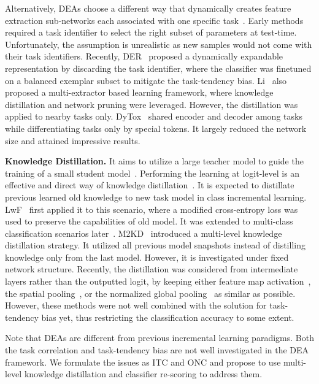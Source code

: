\documentclass[letterpaper]{article} %
\begin{document}
Alternatively, DEAs choose a different way that dynamically creates feature extraction sub-networks each associated with one specific task~\cite{t23, t27, t33, t56, t11, t67}. Early methods required a task identifier to select the right subset of parameters at test-time. Unfortunately, the assumption is unrealistic as new samples would not come with their task identifiers. Recently, DER~\cite{t70} proposed a dynamically expandable representation by discarding the task identifier, where the classifier was finetuned on a balanced exemplar subset to mitigate the task-tendency bias. Li~\cite{t47} also proposed a multi-extractor based learning framework, where knowledge distillation and network pruning were leveraged. However, the distillation was applied to nearby tasks only. DyTox~\cite{t0} shared encoder and decoder among tasks while differentiating tasks only by special tokens. It largely reduced the network size and attained impressive results. 


\noindent\textbf{Knowledge Distillation.}
It aims to utilize a large teacher model to guide the training of a small student model~\cite{r9,yang2022multi,yang2022rd}. Performing the learning at logit-level is an effective and direct way of knowledge distillation~\cite{e14}. It is expected to distillate previous learned old knowledge to new task model in class incremental learning. LwF~\cite{w20} first applied it to this scenario, where a modified cross-entropy loss was used to preserve the capabilities of old model. It was extended to multi-class classification scenarios later~\cite{t54}. M2KD~\cite{w39} introduced a multi-level knowledge distillation strategy. It utilized all previous model snapshots instead of distilling knowledge only from the last model. However, it is investigated under fixed network structure. Recently, the distillation was considered from intermediate layers rather than the outputted logit, by keeping either feature map activation~\cite{p24}, the spatial pooling~\cite{t19}, or the normalized global pooling~\cite{t32} as similar as possible. However, these methods were not well combined with the solution for task-tendency bias yet, thus restricting the classification accuracy to some extent. 

Note that DEAs are different from previous incremental learning paradigms. Both the task correlation and task-tendency bias are not well investigated in the DEA framework. We formulate the issues as ITC and ONC and propose to use multi-level knowledge distillation and classifier re-scoring to address them.
\end{document}
